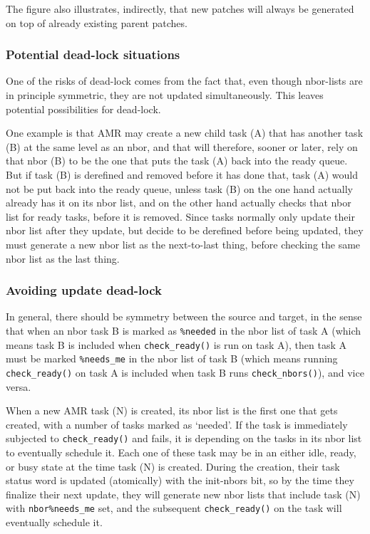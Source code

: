 \documentclass[paper=a4,fontsize=11pt]{scrartcl}
\numberwithin{equation}{section}		%
\numberwithin{figure}{section}			%
\numberwithin{table}{section}				%
\newcommand{\codecolor}{\color{Blue}}
\newcommand{\Code}[1]{{\codecolor\texttt{#1}}}
\def\checkready{\Code{check\_ready()}}
\def\checknbors{\Code{check\_nbors()}}
\begin{document}
The figure also illustrates, indirectly, that new patches will always be generated on top of already existing parent patches.

\subsubsection{Potential dead-lock situations}
One of the risks of dead-lock comes from the fact that, even though nbor-lists are in principle symmetric, they are not updated simultaneously. This leaves potential possibilities for dead-lock.

One example is that AMR may create a new child task (A) that has another task (B) at the same level as an nbor, and that will therefore, sooner or later, rely on that nbor (B) to be the one that puts the task (A) back into the ready queue.  But if task (B) is derefined and removed before it has done that, task (A) would not be put back into the ready queue, unless task (B) on the one hand actually already has it on its nbor list, and on the other hand actually checks that nbor list for ready tasks, before it is removed.   Since tasks normally only update their nbor list after they update, but decide to be derefined before being updated, they must generate a new nbor list as the next-to-last thing, before checking the same nbor list as the last thing.

\subsubsection{Avoiding update dead-lock}
In general, there should be symmetry between the source and target, in the sense that when an nbor task B is marked as \Code{\%needed} in the nbor list of task A (which means task B is included when \checkready{} is run on task A), then task A must be marked \Code{\%needs\_me} in the nbor list of task B (which means running \checkready{} on task A is included when task B runs \checknbors{}), and vice versa.

When a new AMR task (N) is created, its nbor list is the first one that gets created, with a number of tasks marked as `needed'.  If the task is immediately subjected to \checkready{} and fails, it is depending on the tasks in its nbor list to eventually schedule it.  Each one of these task may be in an either idle, ready, or busy state at the time task (N) is created.  During the creation, their task status word is updated (atomically) with the init-nbors bit, so by the time they finalize their next update, they will generate new nbor lists that include task (N) with \Code{nbor\%needs\_me} set, and the subsequent \checkready{} on the task will eventually schedule it.
\end{document}
